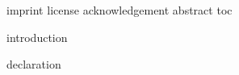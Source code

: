 










\pagestyle{scrheadings}

\frontmatter

{imprint}
{license}
{acknowledgement}
{abstract}
{toc}

\mainmatter
{introduction}

\cleardoublepage
{}
{}



\backmatter
{declaration}


